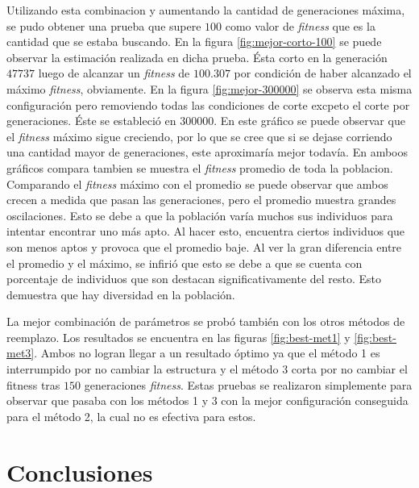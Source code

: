 \documentclass[11pt,a4paper]{article}
\begin{document}
Utilizando esta combinacion y aumentando la cantidad de generaciones máxima, se pudo obtener una prueba que supere $100$ como valor de \emph{fitness} que es la cantidad que se estaba buscando. En la figura \ref{fig:mejor-corto-100} se puede observar la estimación realizada en dicha prueba. Ésta corto en la generación $47737$ luego de alcanzar un \emph{fitness} de $100.307$ por condición de haber alcanzado el máximo \emph{fitness}, obviamente. En la figura \ref{fig:mejor-300000} se observa esta misma configuración pero removiendo todas las condiciones de corte excpeto el corte por generaciones. Éste se estableció en $300000$. En este gráfico se puede observar que el \emph{fitness} máximo sigue creciendo, por lo que se cree que si se dejase corriendo una cantidad mayor de generaciones, este aproximaría mejor todavía.
En amboos gráficos compara tambien se muestra el \emph{fitness} promedio de toda la poblacion. Comparando el \emph{fitness} máximo con el promedio se puede observar que ambos crecen a medida que pasan las generaciones, pero el promedio muestra grandes oscilaciones. Esto se debe a que la población varía muchos sus individuos para intentar encontrar uno más apto. Al hacer esto, encuentra ciertos individuos que son menos aptos y provoca que el promedio baje. Al ver la gran diferencia entre el promedio y el máximo, se infirió que esto se debe a que se cuenta con porcentaje de individuos que son destacan significativamente del resto. Esto demuestra que hay diversidad en la población.

La mejor combinación de parámetros se probó también con los otros métodos de reemplazo. Los resultados se encuentra en las figuras \ref{fig:best-met1} y \ref{fig:best-met3}. Ambos no logran llegar a un resultado óptimo ya que el método 1 es interrumpido por no cambiar la estructura y el método 3 corta por no cambiar el fitness tras $150$ generaciones \emph{fitness}. Estas pruebas se realizaron simplemente para observar que pasaba con los métodos 1 y 3 con la mejor configuración conseguida para el método 2, la cual no es efectiva para estos.

\section{Conclusiones}
\end{document}
